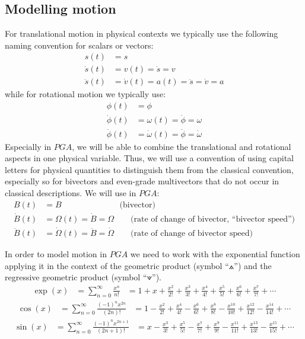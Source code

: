 \subsection{Modelling motion}
\label{subsection_modelling_motion}

For translational motion in physical contexts we typically use the following naming
convention for scalars or vectors:
\begin{align*}
s(t)        & = s \\
\dot{s}(t)  & = v(t) = \dot{s} = v \\
\ddot{s}(t) & = \dot{v}(t) = a(t) =\ddot{s} = \dot{v} = a
\end{align*}
while for rotational motion we typically use:
\begin{align*}
\phi(t)        & = \phi \\
\dot{\phi}(t)  & = \omega(t) = \dot{\phi} = \omega \\
\ddot{\phi}(t) & = \dot{\omega}(t) =\ddot{\phi} = \dot{\omega}
\end{align*}
Especially in $PGA$, we will be able to combine the translational and rotational aspects
in one physical variable. Thus, we will use a convention of using capital letters for
physical quantities to distinguish them from the classical convention, especially so for
bivectors and even-grade multivectors that do not occur in classical descriptions. We will
use in $PGA$:
\begin{align*}
B(t)        & = B \qquad \qquad \qquad  \quad \! \text{(bivector)} \\
\dot{B}(t)  & = \Omega(t) = \dot{B} = \Omega \qquad
                \text{(rate of change of bivector, ``bivector speed'')} \\
\ddot{B}(t) & = \dot{\Omega}(t) =\ddot{B} = \dot{\Omega} \qquad
                \text{(rate of change of bivector speed)}
\end{align*}

In order to model motion in $PGA$ we need to work with the exponential function applying
it in the context of the geometric product (symbol ``$\wedgedot$'') and the regressive
geometric product (symbol ``$\veedot$'').
\begin{align}
\exp(x) &= \sum_{n=0}^{\infty} \frac{x^n}{n!} 
&= 1 + x + \frac{x^2}{2!} + \frac{x^3}{3!} + \frac{x^4}{4!} +
\frac{x^5}{5!} + \frac{x^6}{6!} + \frac{x^7}{7!} + \cdots
\label{eq:exp_taylor}
\end{align}
\begin{align}
\cos(x) &= \sum_{n=0}^{\infty} \frac{(-1)^n x^{2n}}{(2n)!} 
&= 1 - \frac{x^2}{2!} + \frac{x^4}{4!} - \frac{x^6}{6!} + \frac{x^8}{8!}
- \frac{x^{10}}{10!} + \frac{x^{12}}{12!} - \frac{x^{14}}{14!} + \cdots
\label{eq:cos_taylor}
\end{align}
\begin{align}
\sin(x) &= \sum_{n=0}^{\infty} \frac{(-1)^n x^{2n+1}}{(2n+1)!} 
&= x - \frac{x^3}{3!} + \frac{x^5}{5!} - \frac{x^7}{7!} + \frac{x^9}{9!}
- \frac{x^{11}}{11!} + \frac{x^{13}}{13!} - \frac{x^{15}}{15!} + \cdots
\label{eq:sin_taylor}
\end{align}

